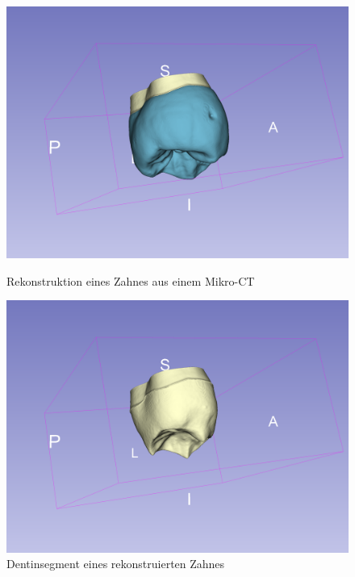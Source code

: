 \begin{figure}[h]
	\centering
	\begin{minipage}[b]{0.32\textwidth}
		\centering
		\includegraphics[width=\textwidth]{img/3dView.png}
		\caption{Rekonstruktion eines Zahnes aus einem Mikro-CT}
		\label{fig:3d_view}
	\end{minipage}
	\hfill
	\begin{minipage}[b]{0.32\textwidth}
		\centering
		\includegraphics[width=\textwidth]{img/3dViewDentin.png}
		\caption{Dentinsegment eines rekonstruierten Zahnes}
		\label{fig:3d_view_dentin}
	\end{minipage}
	\hfill
	\begin{minipage}[b]{0.32\textwidth}
		\centering

\end{minipage}
\end{figure}
